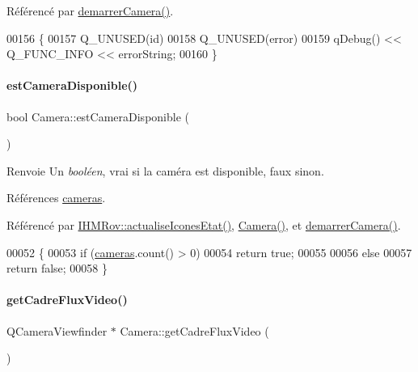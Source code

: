 Référencé par \hyperlink{class_camera_a7eb23e1a5fe67c61f36b8a97ff1f882c}{demarrer\+Camera()}.


\begin{DoxyCode}
00156 \{
00157     Q\_UNUSED(\textcolor{keywordtype}{id})
00158     Q\_UNUSED(error)
00159     qDebug() << Q\_FUNC\_INFO << errorString;
00160 \}
\end{DoxyCode}
\mbox{\label{class_camera_afb73ab859802a143a1a00443e396143e}} 
\paragraph{\texorpdfstring{est\+Camera\+Disponible()}{estCameraDisponible()}}
{\footnotesize\ttfamily bool Camera\+::est\+Camera\+Disponible (\begin{DoxyParamCaption}{ }\end{DoxyParamCaption})}

\begin{DoxyReturn}{Renvoie}
Un {\itshape booléen}, vrai si la caméra est disponible, faux sinon. 
\end{DoxyReturn}


Références \hyperlink{class_camera_a3bea5177e857533a53cb94135bee8c6b}{cameras}.



Référencé par \hyperlink{class_i_h_m_rov_abbfcdc154a6ae7f941d186f6c90a5a2b}{I\+H\+M\+Rov\+::actualise\+Icones\+Etat()}, \hyperlink{class_camera_ae3aa4afd7a3d9ddc2bf710bc74dc293e}{Camera()}, et \hyperlink{class_camera_a7eb23e1a5fe67c61f36b8a97ff1f882c}{demarrer\+Camera()}.


\begin{DoxyCode}
00052 \{
00053     \textcolor{keywordflow}{if} (\hyperlink{class_camera_a3bea5177e857533a53cb94135bee8c6b}{cameras}.count() > 0)
00054         \textcolor{keywordflow}{return} \textcolor{keyword}{true};
00055 
00056     \textcolor{keywordflow}{else}
00057         \textcolor{keywordflow}{return} \textcolor{keyword}{false};
00058 \}
\end{DoxyCode}
\mbox{\label{class_camera_a67420d3ef14065a412327ada6193a2e0}} 
\paragraph{\texorpdfstring{get\+Cadre\+Flux\+Video()}{getCadreFluxVideo()}}
{\footnotesize\ttfamily Q\+Camera\+Viewfinder $\ast$ Camera\+::get\+Cadre\+Flux\+Video (\begin{DoxyParamCaption}{ }\end{DoxyParamCaption})}

